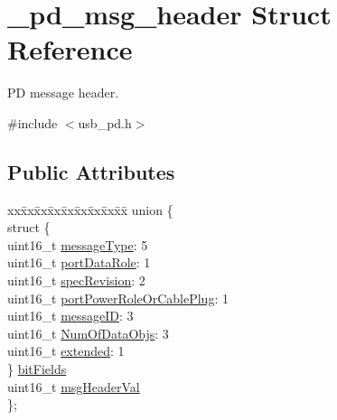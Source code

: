 \hypertarget{struct__pd__msg__header}{\section{\-\_\-pd\-\_\-msg\-\_\-header Struct Reference}
\label{struct__pd__msg__header}
}


P\-D message header.  




{\ttfamily \#include $<$usb\-\_\-pd.\-h$>$}

\subsection*{Public Attributes}
\begin{DoxyCompactItemize}
\item 
\begin{tabbing}
xx\=xx\=xx\=xx\=xx\=xx\=xx\=xx\=xx\=\kill
union \{\\
\>struct \{\\
\>\>uint16\_t \hyperlink{struct__pd__msg__header_a8f988edb3c2320265a31f058551383de}{messageType}: 5\\
\>\>uint16\_t \hyperlink{struct__pd__msg__header_a61dc0107cc94695c5225a034732acc25}{portDataRole}: 1\\
\>\>uint16\_t \hyperlink{struct__pd__msg__header_a037df5a4b49f0a0e035aaa28201ae20e}{specRevision}: 2\\
\>\>uint16\_t \hyperlink{struct__pd__msg__header_ac52d867212ad7dd16b5202a1fee17866}{portPowerRoleOrCablePlug}: 1\\
\>\>uint16\_t \hyperlink{struct__pd__msg__header_a2007d25305ee31d9ab6aa01ee6025255}{messageID}: 3\\
\>\>uint16\_t \hyperlink{struct__pd__msg__header_af835bee782d843ce60f85c5734a628b4}{NumOfDataObjs}: 3\\
\>\>uint16\_t \hyperlink{struct__pd__msg__header_a29b5707169e4c8d770aa0a80aecc77c5}{extended}: 1\\
\>\} \hyperlink{struct__pd__msg__header_a6dc4609c23d8d9e5d8830177d959fe17}{bitFields}\\
\>uint16\_t \hyperlink{struct__pd__msg__header_a3be91c1e7084d53533ddf706f450c28b}{msgHeaderVal}\\
\}; \\

\end{tabbing}\end{DoxyCompactItemize}


